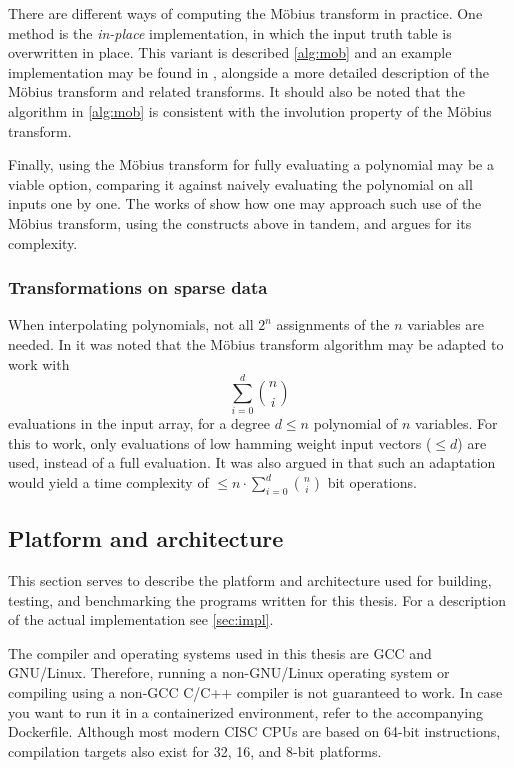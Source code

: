 There are different ways of computing the Möbius transform in practice. One method is the \textit{in-place} implementation, in which the input truth table is overwritten in place. This variant is described \cref{alg:mob} and an example implementation may be found in \cite{joux2009algorithmic}, alongside a more detailed description of the Möbius transform and related transforms. It should also be noted that the algorithm in \cref{alg:mob} is consistent with the involution property of the Möbius transform.

Finally, using the Möbius transform for fully evaluating a polynomial may be a viable option, comparing it against naively evaluating the polynomial on all inputs one by one. The works of \cite{fse-2011-23547} show how one may approach such use of the Möbius transform, using the constructs above in tandem, and argues for its complexity.

\subsubsection{Transformations on sparse data}
When interpolating polynomials, not all $2^n$ assignments of the $n$ variables are needed. In \cite{eurocrypt-2021-30841} it was noted that the Möbius transform algorithm may be adapted to work with 
$$
    \sum_{i = 0}^{d} \binom{n}{i}
$$
evaluations in the input array, for a degree $d \leq n$ polynomial of $n$ variables. For this to work, only evaluations of low hamming weight input vectors ($\leq d$) are used, instead of a full evaluation. It was also argued in \cite{eurocrypt-2021-30841} that such an adaptation would yield a time complexity of $\leq n \cdot \sum_{i = 0}^{d}\binom{n}{i}$ bit operations.

\subsection{Platform and architecture}

This section serves to describe the platform and architecture used for building, testing, and benchmarking the programs written for this thesis. For a description of the actual implementation see \cref{sec:impl}.

The compiler and operating systems used in this thesis are GCC and GNU/Linux. Therefore, running a non-GNU/Linux operating system or compiling using a non-GCC C/C++ compiler is not guaranteed to work. In case you want to run it in a containerized environment, refer to the accompanying Dockerfile. Although most modern CISC CPUs are based on 64-bit instructions, compilation targets also exist for 32, 16, and 8-bit platforms.

